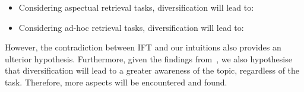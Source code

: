 \begin{itemize}
\item Considering aspectual retrieval tasks, diversification will lead to:

\vspace*{1.5mm}

\item Considering ad-hoc retrieval tasks, diversification will lead to:
\end{itemize}

However, the contradiction between IFT and our intuitions also provides an ulterior hypothesis. Furthermore, given the findings from~\cite{syed2017sal}, we also hypothesise that diversification will lead to a greater awareness of the topic, regardless of the task. Therefore, more aspects will be encountered and found.






